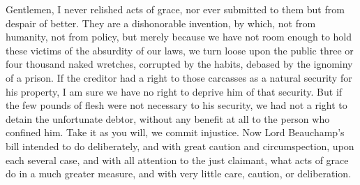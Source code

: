 Gentlemen, I never relished acts of grace, nor ever submitted to them but from despair of better. They are a dishonorable invention, by which, not from humanity, not from policy, but merely because we have not room enough to hold these victims of the absurdity of our laws, we turn loose upon the public three or four thousand naked wretches, corrupted by the habits, debased by the ignominy of a prison. If the creditor had a right to those carcasses as a natural security for his property, I am sure we have no right to deprive him of that security. But if the few pounds of flesh were not necessary to his security, we had not a right to detain the unfortunate debtor, without any benefit at all to the person who confined him. Take it as you will, we commit injustice. Now Lord Beauchamp's bill intended to do deliberately, and with great caution and circumspection, upon each several case, and with all attention to the just claimant, what acts of grace do in a much greater measure, and with very little care, caution, or deliberation.

